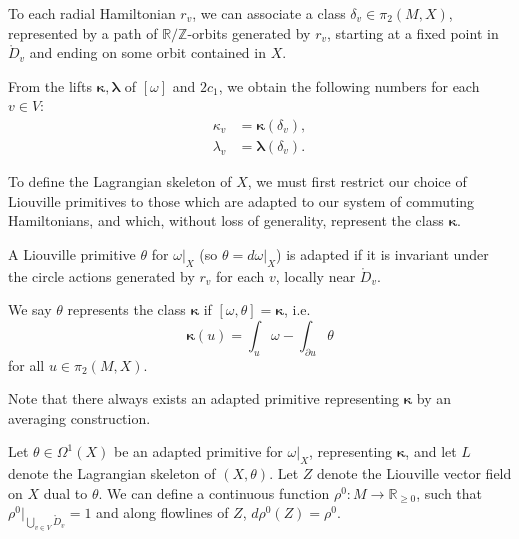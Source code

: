 \documentclass{article}
\numberwithin{equation}{section}
\numberwithin{figure}{section}
\begin{document}
\begin{defn}
\label{action_def}
To each radial Hamiltonian $r_v$, we can associate a class $\delta_v\in \pi_2(M,X)$, represented by a path of $\mathbb{R}/\mathbb{Z}$-orbits generated by $r_v$, starting at a fixed point in $\mathring{D}_v$ and ending on some orbit contained in $X$. 

From the lifts $\pmb{\kappa},\pmb{\lambda}$ of $[\omega]$ and $2c_1$, we obtain the following numbers for each $v\in V$: 
\begin{equation}
\begin{split}
\kappa_v&=\pmb{\kappa}(\delta_v),
\\\lambda_v&=\pmb{\lambda}(\delta_v).
\end{split}
\end{equation}
\end{defn}

To define the Lagrangian skeleton of $X$, we must first restrict  our choice of Liouville primitives to those which are adapted to our system of commuting Hamiltonians, and which, without loss of generality, represent the class $\pmb{\kappa}$.
\begin{defn}
    A Liouville primitive $\theta$ for $\omega|_X$ (so $\theta=d\omega|_X$) is adapted if it is invariant under the circle actions generated by $r_v$ for each $v$, locally near $\mathring{D}_v$.

    We say $\theta$ represents the class $\pmb{\kappa}$ if $[\omega,\theta]=\pmb{\kappa}$, i.e.
    \begin{equation}
        \pmb{\kappa}(u)=\int_u\omega-\int_{\partial u}\theta
    \end{equation}
    for all $u\in \pi_2(M,X)$.

    Note that there always exists an adapted primitive representing $\pmb{\kappa}$ by an averaging construction.
\end{defn}

Let $\theta\in\Omega^1(X)$ be an adapted primitive for $\omega|_X$, representing $\pmb{\kappa}$, and let $L$ denote the Lagrangian skeleton of $(X,\theta)$. Let $Z$ denote the Liouville vector field on $X$ dual to $\theta$. We can define a continuous function $\rho^0:M\rightarrow \mathbb{R}_{\geq 0}$, such that $\rho^0|_{\bigcup_{v\in V}\mathring{D}_v}=1$ and along flowlines of $Z$, $d\rho^0(Z)=\rho^0$.
\end{document}
